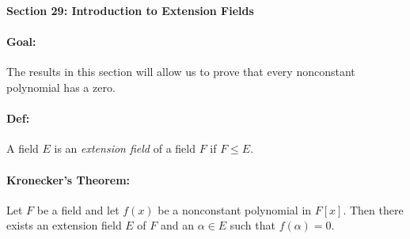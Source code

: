 \documentclass[10pt,a4paper]{article}
\begin{document}
\begin{center}
\textbf{Section 29: Introduction to Extension Fields}
\end{center}

\paragraph{Goal:} The results in this section will allow us to prove that every nonconstant polynomial has a zero.

\paragraph{Def:} A field $E$ is an \textit{extension field} of a field $F$ if $F \leq E$.

\paragraph{Kronecker's Theorem:} Let $F$ be a field and let $f(x)$ be a nonconstant polynomial in $F[x]$. Then there exists an extension field $E$ of $F$ and an $\alpha \in E$ such that $f(\alpha) =0$.
\end{document}
